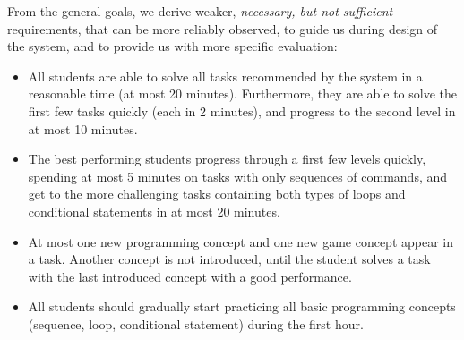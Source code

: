 From the general goals, we derive weaker,
\emph{necessary, but not sufficient} requirements, that can be more reliably observed,
to guide us during design of the system,
and to provide us with more specific evaluation:  %
\begin{itemize}
\item All students are able to solve all tasks recommended by the system
  in a reasonable time (at most 20 minutes).
  Furthermore, they are able to solve the first few tasks quickly
  (each in 2 minutes), and progress to the second level in at most 10 minutes.
\item The best performing students %
progress through a first few levels quickly, spending at most 5 minutes
on tasks with only sequences of commands, and get to the more
challenging tasks containing both types of loops and conditional statements
in at most 20 minutes.  %
\item At most one new programming concept and one new game concept appear
  in a task. Another concept is not introduced, until the student
  solves a task with the last introduced concept with a good
  performance. %
\item All students should gradually start practicing all basic programming concepts
  (sequence, loop, conditional statement) during the first hour. %
\end{itemize}


